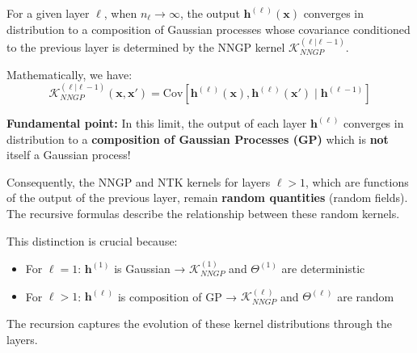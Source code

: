 \documentclass[a4paper]{article}
\theoremstyle{plain}
\theoremstyle{definition}
\theoremstyle{remark}
\begin{document}
\begin{tcolorbox}[colback=yellow!5,colframe=yellow!80!black,title={\textbf{Definition: Neural Network Gaussian Process (NNGP)}},enhanced,drop shadow,boxrule=2pt]
For a given layer $\ell$, when $n_\ell \to \infty$, the output $\bm{h}^{(\ell)}(\bm{x})$ converges in 
distribution to a composition of Gaussian processes whose covariance conditioned to the previous layer is determined by the NNGP kernel $\mathcal{K}_{NNGP}^{(\ell | \ell-1)}$.

Mathematically, we have:
\begin{equation}
\mathcal{K}_{NNGP}^{(\ell | \ell-1 )}(\bm{x}, \bm{x}') = \text{Cov}\left[\bm{h}^{(\ell)}(\bm{x}), \bm{h}^{(\ell)}(\bm{x}') \mid \bm{h}^{(\ell-1)}\right]
\end{equation}
\end{tcolorbox}

\begin{tcolorbox}[colback=red!10,colframe=red!80!black,title={\textbf{Crucial Remark: Composition of Gaussian Processes}},enhanced,drop shadow,boxrule=2pt]
\textbf{Fundamental point:} In this limit, the output of each layer $\bm{h}^{(\ell)}$ converges in distribution to a \textbf{composition of Gaussian Processes (GP)} which is \textbf{not} itself a Gaussian process!

Consequently, the NNGP and NTK kernels for layers $\ell > 1$, which are functions of the output of the previous layer, remain \textbf{random quantities} (random fields). The recursive formulas describe the relationship between these random kernels.

This distinction is crucial because:
\begin{itemize}
\item For $\ell = 1$: $\bm{h}^{(1)}$ is Gaussian → $\mathcal{K}_{NNGP}^{(1)}$ and $\Theta^{(1)}$ are deterministic
\item For $\ell > 1$: $\bm{h}^{(\ell)}$ is composition of GP → $\mathcal{K}_{NNGP}^{(\ell)}$ and $\Theta^{(\ell)}$ are random
\end{itemize}

The recursion captures the evolution of these kernel distributions through the layers.
\end{tcolorbox}
\end{document}
